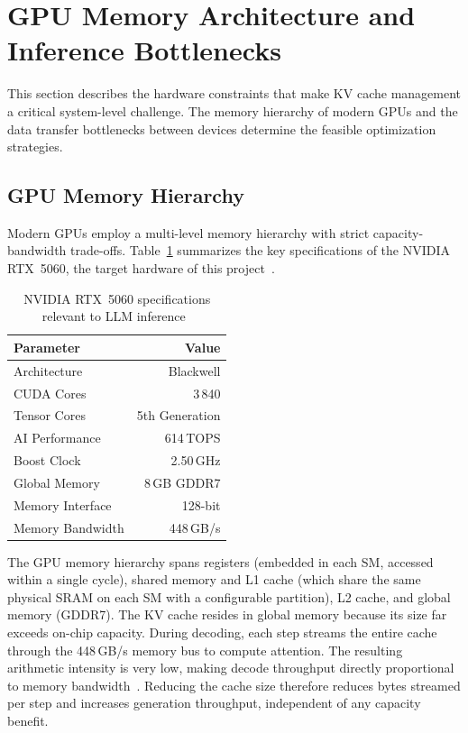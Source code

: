 \documentclass[
english,                 %
bibtex,                  %
]{kththesis}
\numberwithin{listing}{chapter}
\begin{document}
\section{GPU Memory Architecture and Inference Bottlenecks}
\label{sec:bg-gpu-memory}

This section describes the hardware constraints that make \gls{KV} cache management a critical system-level challenge. The memory hierarchy of modern \glspl{GPU} and the data transfer bottlenecks between devices determine the feasible optimization strategies.


\subsection{GPU Memory Hierarchy}
\label{sec:bg-gpu-hierarchy}

Modern \glspl{GPU} employ a multi-level memory hierarchy with strict capacity-bandwidth trade-offs. Table~\ref{tab:gpu-memory-hierarchy} summarizes the key specifications of the NVIDIA RTX~5060, the target hardware of this project~\cite{nvidia2025rtx50series}.

\begin{table}[!ht]
  \centering
  \caption{NVIDIA RTX~5060 specifications relevant to \gls{LLM} inference~\cite{nvidia2025rtx50series}}
  \label{tab:gpu-memory-hierarchy}
  \begin{tabular}{l r}
    \toprule
    \textbf{Parameter} & \textbf{Value} \\
    \midrule
    Architecture           & Blackwell \\
    \gls{CUDA} Cores             & 3\,840 \\
    Tensor Cores           & 5th Generation \\
    AI Performance         & 614\,TOPS \\
    Boost Clock            & 2.50\,GHz \\
    Global Memory          & 8\,GB GDDR7 \\
    Memory Interface       & 128-bit \\
    Memory Bandwidth       & 448\,GB/s \\
    \bottomrule
  \end{tabular}
\end{table}

The \gls{GPU} memory hierarchy spans registers (embedded in each \gls{SM}, accessed within a single cycle), shared memory and L1 cache (which share the same physical SRAM on each \gls{SM} with a configurable partition), L2 cache, and global memory (GDDR7). The \gls{KV} cache resides in global memory because its size far exceeds on-chip capacity. During decoding, each step streams the entire cache through the 448\,GB/s memory bus to compute attention. The resulting arithmetic intensity is very low, making decode throughput directly proportional to memory bandwidth~\cite{pope2023efficiently}. Reducing the cache size therefore reduces bytes streamed per step and increases generation throughput, independent of any capacity benefit.
\end{document}
